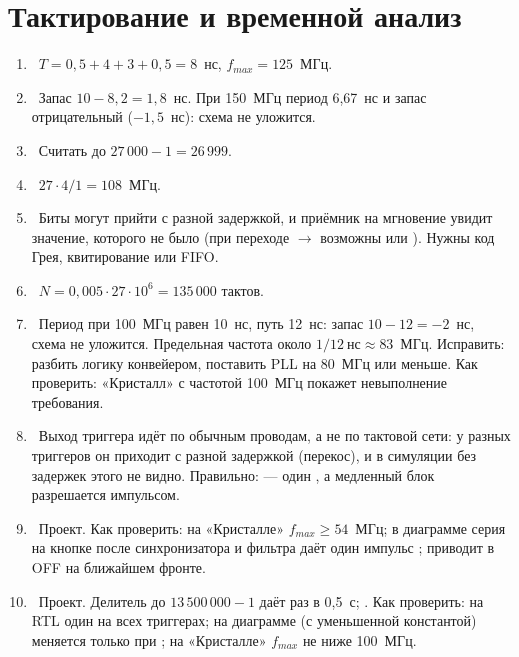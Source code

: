 \section*{Тактирование и временной анализ}
\begin{enumerate}
  \item {}~$T = 0{,}5+4+3+0{,}5 = 8$~нс, $f_{max}=125$~МГц.
  \item {}~Запас $10-8{,}2=1{,}8$~нс. При 150~МГц период 6,67~нс и запас отрицательный ($-1{,}5$~нс): схема не уложится.
  \item {}~Считать до $27\,000-1 = 26\,999$.
  \item {}~$27\cdot 4/1 = 108$~МГц.
  \item {}~Биты могут прийти с разной задержкой, и приёмник на мгновение увидит значение, которого не было (при переходе $\to$ возможны  или ). Нужны код Грея, квитирование или FIFO.
  \item {}~$N = 0{,}005\cdot 27\cdot 10^6 = 135\,000$ тактов.
  \item {}~Период при 100~МГц равен 10~нс, путь 12~нс: запас $10-12=-2$~нс, схема не уложится. Предельная частота около $1/12~\text{нс}\approx 83$~МГц. Исправить: разбить логику конвейером, поставить PLL на 80~МГц или меньше. Как проверить: «Кристалл» с частотой 100~МГц покажет невыполнение требования.
  \item {}~Выход триггера идёт по обычным проводам, а не по тактовой сети: у разных триггеров он приходит с разной задержкой (перекос), и в симуляции без задержек этого не видно. Правильно:  --- один , а медленный блок разрешается импульсом.
  \item {}~Проект. Как проверить: на «Кристалле» $f_{max}\ge 54$~МГц; в диаграмме серия  на кнопке после синхронизатора и фильтра даёт один импульс ;  приводит  в OFF на ближайшем фронте.
  \item {}~Проект. Делитель до $13\,500\,000-1$ даёт  раз в 0,5~с; . Как проверить: на RTL один  на всех триггерах; на диаграмме (с уменьшенной константой)  меняется только при ; на «Кристалле» $f_{max}$ не ниже 100~МГц.
\end{enumerate}

